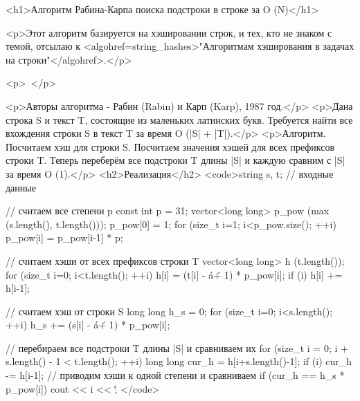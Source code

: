 <h1>Алгоритм Рабина-Карпа поиска подстроки в строке за O (N)</h1>

<p>Этот алгоритм базируется на хэшировании строк, и тех, кто не знаком с темой, отсылаю к <algohref=string_hashes>"Алгоритмам хэширования в задачах на строки"</algohref>.</p>

<p> </p>

<p>Авторы алгоритма - Рабин (Rabin) и Карп (Karp), 1987 год.</p>
<p>Дана строка S и текст T, состоящие из маленьких латинских букв. Требуется найти все вхождения строки S в текст T за время O (|S| + |T|).</p>
<p>Алгоритм. Посчитаем хэш для строки S. Посчитаем значения хэшей для всех префиксов строки T. Теперь переберём все подстроки T длины |S| и каждую сравним с |S| за время O (1).</p>
<h2>Реализация</h2>
<code>string s, t; // входные данные

// считаем все степени p
const int p = 31;
vector<long long> p_pow (max (s.length(), t.length()));
p_pow[0] = 1;
for (size_t i=1; i<p_pow.size(); ++i)
	p_pow[i] = p_pow[i-1] * p;

// считаем хэши от всех префиксов строки T
vector<long long> h (t.length());
for (size_t i=0; i<t.length(); ++i)
{
	h[i] = (t[i] - \'a\' + 1) * p_pow[i];
	if (i)  h[i] += h[i-1];
}

// считаем хэш от строки S
long long h_s = 0;
for (size_t i=0; i<s.length(); ++i)
	h_s += (s[i] - \'a\' + 1) * p_pow[i];

// перебираем все подстроки T длины |S| и сравниваем их
for (size_t i = 0; i + s.length() - 1 < t.length(); ++i)
{
	long long cur_h = h[i+s.length()-1];
	if (i)  cur_h -= h[i-1];
	// приводим хэши к одной степени и сравниваем
	if (cur_h == h_s * p_pow[i])
		cout << i << \' \';
}</code>